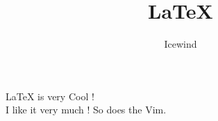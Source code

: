 \documentclass{article}
\title{\LaTeX{}}
\author{Icewind}
\begin{document}
\maketitle
\LaTeX{} is very Cool !\\
I like it very much ! So does the Vim.
\end{document}
